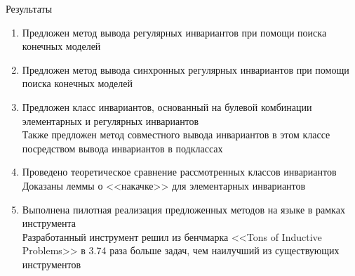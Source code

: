 \begin{framesection}{Результаты}
\begin{enumerate}
\item Предложен метод вывода регулярных инвариантов при помощи поиска конечных моделей
\item Предложен метод вывода синхронных регулярных инвариантов при помощи поиска конечных моделей
\item Предложен класс инвариантов, основанный на булевой комбинации элементарных и регулярных инвариантов\\Также предложен метод совместного вывода инвариантов в этом классе посредством вывода инвариантов в подклассах
\item Проведено теоретическое сравнение рассмотренных классов инвариантов\\Доказаны леммы о <<накачке>> для элементарных инвариантов
\item Выполнена пилотная реализация предложенных методов на языке \fsharp{} в рамках инструмента \theringen{}\\Разработанный инструмент решил из бенчмарка <<Tons of Inductive Problems>> в 3.74 раза больше задач, чем наилучший из существующих инструментов
\end{enumerate}
\end{framesection}
